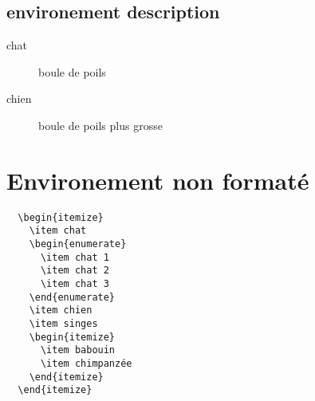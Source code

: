 \documentclass[a4paper,12pt]{article}
\begin{document}
\subsection{environement description}
\begin{description}
  \item[chat] boule de poils
  \item[chien] boule de poils plus grosse \blindtext
\end{description}

\section{Environement non formaté}
\begin{verbatim}
  \begin{itemize}
    \item chat
    \begin{enumerate}
      \item chat 1
      \item chat 2
      \item chat 3
    \end{enumerate}
    \item chien
    \item singes
    \begin{itemize}
      \item babouin
      \item chimpanzée
    \end{itemize}
  \end{itemize}
\end{verbatim}
\newpage
\layout
\end{document}
